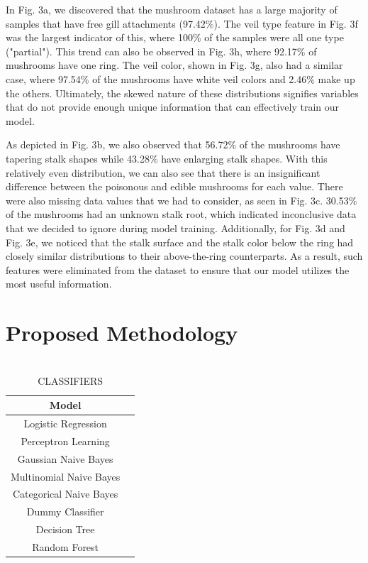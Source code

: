 \documentclass[11pt, conference]{IEEEtran}
\begin{document}
    In Fig. 3a, we discovered that the mushroom dataset has a large majority of samples that have free gill attachments (97.42\%). The veil type feature in Fig. 3f was the largest indicator of this, where 100\% of the samples were all one type ("partial"). This trend can also be observed in Fig. 3h, where 92.17\% of mushrooms have one ring. The veil color, shown in Fig. 3g, also had a similar case, where 97.54\% of the mushrooms have white veil colors and 2.46\% make up the others. Ultimately, the skewed nature of these distributions signifies variables that do not provide enough unique information that can effectively train our model.

    As depicted in Fig. 3b, we also observed that 56.72\% of the mushrooms have tapering stalk shapes while 43.28\% have enlarging stalk shapes. With this relatively even distribution, we can also see that there is an insignificant difference between the poisonous and edible mushrooms for each value. There were also missing data values that we had to consider, as seen in Fig. 3c. 30.53\% of the mushrooms had an unknown stalk root, which indicated inconclusive data that we decided to ignore during model training. Additionally, for Fig. 3d and Fig. 3e, we noticed that the stalk surface and the stalk color below the ring had closely similar distributions to their above-the-ring counterparts. As a result, such features were eliminated from the dataset to ensure that our model utilizes the most useful information.

\section{Proposed Methodology}
    \begin{table}[htbp]
        \centering  
        \caption{\\ CLASSIFIERS}
        \begin{tabular}{cc} \toprule
            \textbf{Model} \\
            \midrule
                Logistic Regression \\
            \midrule
                Perceptron Learning \\
            \midrule
                Gaussian Naive Bayes \\
            \midrule
                Multinomial Naive Bayes \\
            \midrule
                Categorical Naive Bayes \\
            \midrule
                Dummy Classifier \\
            \midrule
                Decision Tree \\
            \midrule
                Random Forest \\
            \bottomrule
        \end{tabular}
    \end{table}
\end{document}
